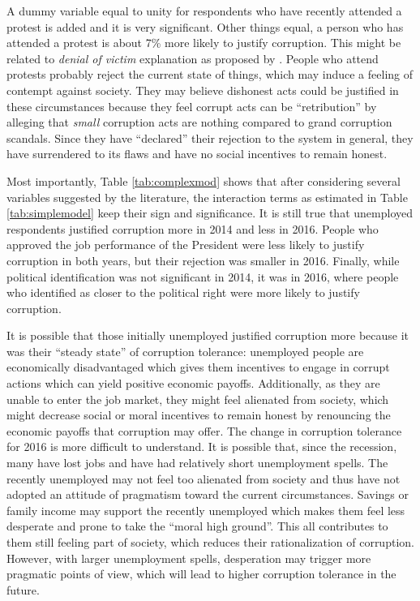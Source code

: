 \documentclass[12pt,a4]{article}\usepackage[]{graphicx}\usepackage[]{xcolor}
\begin{document}


A dummy variable equal to unity for respondents who have recently attended a protest is added and it is very significant. Other things equal, a person who has attended a protest is about 7\% more likely to justify corruption. This might be related to \textit{denial of victim} explanation as proposed by \textcite{Ashforth.2003}. People who attend protests probably reject the current state of things, which may induce a feeling of contempt against society. They may believe dishonest acts could be justified in these circumstances because they feel corrupt acts can be \enquote{retribution} by alleging that \textit{small} corruption acts are nothing compared to grand corruption scandals. Since they have \enquote{declared} their rejection to the system in general, they have surrendered to its flaws and have no social incentives to remain honest.

Most importantly, Table \ref{tab:complexmod} shows that after considering several variables suggested by the literature, the interaction terms as estimated in Table \ref{tab:simplemodel} keep their sign and significance. It is still true that unemployed respondents justified corruption more in 2014 and less in 2016. People who approved the job performance of the President were less likely to justify corruption in both years, but their rejection was smaller in 2016. Finally, while political identification was not significant in 2014, it was in 2016, where people who identified as closer to the political right were more likely to justify corruption. 

It is possible that those initially unemployed justified corruption more because it was their \enquote{steady state} of corruption tolerance: unemployed people are economically disadvantaged which gives them incentives to engage in corrupt actions which can yield positive economic payoffs. Additionally, as they are unable to enter the job market, they might feel alienated from society, which might decrease social or moral incentives to remain honest by renouncing the economic payoffs that corruption may offer. The change in corruption tolerance for 2016 is more difficult to understand. It is possible that, since the recession, many have lost jobs and have had relatively short unemployment spells. The recently unemployed may not feel too alienated from society and thus have not adopted an attitude of pragmatism toward the current circumstances. Savings or family income may support the recently unemployed which makes them feel less desperate and prone to take the \enquote{moral high ground}. This all contributes to them still feeling part of society, which reduces their rationalization of corruption. However, with larger unemployment spells, desperation may trigger more pragmatic points of view, which will lead to higher corruption tolerance in the future.
\end{document}
